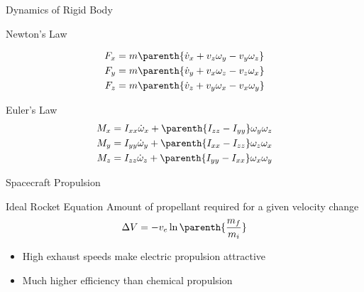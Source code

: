 \begin{frame}[noframenumbering]
\end{frame}%

\begin{frame}[t,noframenumbering]{Dynamics of Rigid Body} %
    \begin{block}{Newton's Law}
        
        \begin{align*}
            F_x &= m \parenth{\dot{v}_x + v_z \omega_y - v_y \omega_z} \\
            F_y &= m \parenth{\dot{v}_y + v_x \omega_z - v_z \omega_x} \\
            F_z &= m \parenth{\dot{v}_z + v_y \omega_x - v_x \omega_y} \\
        \end{align*}
    \end{block}
    
    \begin{block}{Euler's Law}
        \begin{align*}
            {M}_x &= I_{xx} \dot{\omega}_x + \parenth{I_{zz}-I_{yy}} \omega_y \omega_z \\
            {M}_y &= I_{yy} \dot{\omega}_y + \parenth{I_{xx}-I_{zz}} \omega_z \omega_x \\
            {M}_z &= I_{zz} \dot{\omega}_z + \parenth{I_{yy}-I_{xx}} \omega_x \omega_y \\
        \end{align*}
    \end{block}
\end{frame} %

\begin{frame}[noframenumbering]{Spacecraft Propulsion}\label{slide:propulsion}%
\begin{block}{Ideal Rocket Equation}
    Amount of propellant required for a given velocity change
    \[
        \Delta V = - v_e \ln\parenth{\frac{m_f}{m_i}}
    \]
\end{block}

\begin{itemize}
    \item High exhaust speeds make electric propulsion attractive
    \item Much higher efficiency than chemical propulsion
\end{itemize}
\hyperlink{slide:lowthrust_vehicles}{}

\end{frame} %

